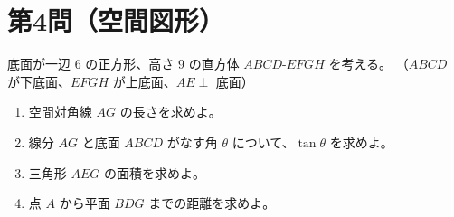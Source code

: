 \documentclass[a4paper,12pt]{jsarticle}
\begin{document}
\section*{第4問（空間図形）}
底面が一辺 \(6\) の正方形、高さ \(9\) の直方体 \(ABCD\text{-}EFGH\) を考える。  
（\(ABCD\) が下底面、\(EFGH\) が上底面、\(AE\perp\) 底面）
\begin{enumerate}[label=\arabic*.]
  \item 空間対角線 \(AG\) の長さを求めよ。
  \item 線分 \(AG\) と底面 \(ABCD\) がなす角 \(\theta\) について、\(\tan\theta\) を求めよ。
  \item 三角形 \(AEG\) の面積を求めよ。
  \item 点 \(A\) から平面 \(BDG\) までの距離を求めよ。
\end{enumerate}
\end{document}
